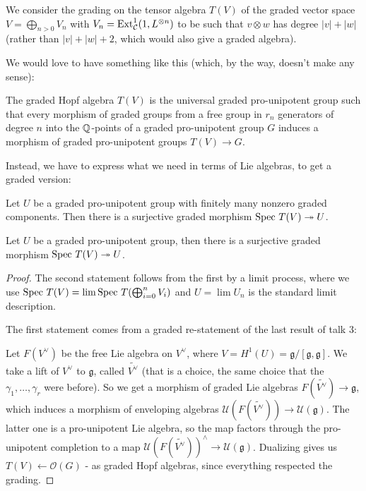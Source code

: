 \begin{defn}
 We consider the grading on the tensor algebra $T(V)$ of the graded vector space $V = \bigoplus_{n > 0} V_n$ with $V_n = \mathrm{Ext}^1_{\mathcal{C}}(1,L^{\otimes n})$ to be such that $v \otimes w$ has degree $|v| + |w|$ (rather than $|v|+|w|+2$, which would also give a graded algebra).
\end{defn}


We would love to have something like this (which, by the way, doesn't make any sense):
\begin{lemma}
 The graded Hopf algebra $T(V)$ is the universal graded pro-unipotent group such that every morphism of graded groups from a free group in $r_n$ generators of degree $n$ into the $\mathbb{Q}$-points of a graded pro-unipotent group $G$ induces a morphism of graded pro-unipotent groups $T(V) \to G$.
\end{lemma}

Instead, we have to express what we need in terms of Lie algebras, to get a graded version:
\begin{lemma}
 Let $U$ be a graded pro-unipotent group with finitely many nonzero graded components. Then there is a surjective graded morphism $\mathrm{Spec}~ T(V) \twoheadrightarrow U$.

Let $U$ be a graded pro-unipotent group, then there is a surjective graded morphism $\mathrm{Spec}~ T(V) \twoheadrightarrow U$.
\end{lemma}
\begin{proof}
 The second statement follows from the first by a limit process, where we use $\mathrm{Spec}~ T(V) = \lim \mathrm{Spec}~ T(\bigoplus_{i=0}^n V_i)$ and $U = \lim U_n$ is the standard limit description.

The first statement comes from a graded re-statement of the last result of talk 3:

Let $F(V^\vee)$ be the free Lie algebra on $V^\vee$, where $V = H^1(U) = \mathfrak{g}/[\mathfrak{g},\mathfrak{g}]$.
We take a lift of $V^\vee$ to $\mathfrak{g}$, called $\tilde{V^\vee}$ (that is a choice, the same choice that the $\gamma_1,\ldots,\gamma_r$ were before).
So we get a morphism of graded Lie algebras $F(\tilde{V^\vee}) \to \mathfrak{g}$,
which induces a morphism of enveloping algebras $\mathcal{U}(F(\tilde{V^\vee})) \to \mathcal{U}(\mathfrak{g})$.
The latter one is a pro-unipotent Lie algebra, so the map factors through the pro-unipotent completion to a map
$\mathcal{U}(F(\tilde{V^\vee}))^{\wedge} \to \mathcal{U}(\mathfrak{g})$.
Dualizing gives us $T(V) \leftarrow \mathcal{O}(G)$ - as graded Hopf algebras, since everything respected the grading.
\end{proof}





